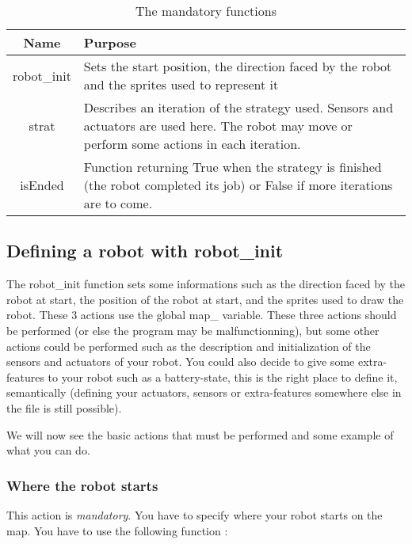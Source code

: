 \documentclass[a4paper,11pt]{article}
\begin{document}
\begin{table}[h]
  \begin{center}
    \begin{tabular}{|c|p{10cm}|}
      \hline
      Name        & Purpose                      \\
      \hline
      robot\_init & Sets the start position, the direction faced by the
      robot and the sprites used to represent it \\
      \hline
      strat       & Describes an iteration of the strategy used. Sensors and
      actuators are used here. The robot may move or perform some
      actions in each iteration.                 \\
      \hline
      isEnded     & Function returning True when the strategy is finished
      (the robot completed its job) or False if more iterations are to
      come.                                      \\ 
      \hline 
    \end{tabular}
    \caption{\label{tab:PyMandatoryFunc} The mandatory functions}
  \end{center}
\end{table}

\subsection{Defining a robot with robot\_init}

The robot\_init function sets some informations such as the direction
faced by the robot at start, the position of the robot at start, and
the sprites used to draw the robot. These 3 actions use the global
map\_ variable. These three actions should be performed (or else the
program may be malfunctionning), but some other actions could be
performed such as the description and initialization of the sensors
and actuators of your robot. You could also decide to give some
extra-features to your robot such as a battery-state, this is the
right place to define it, semantically (defining your actuators,
sensors or extra-features somewhere else in the file is still
possible).

We will now see the basic actions that must be performed and some
example of what you can do.

\subsubsection{Where the robot starts}

This action is \emph{mandatory}. You have to specify where your robot
starts on the map. You have to use the following function :
\end{document}
